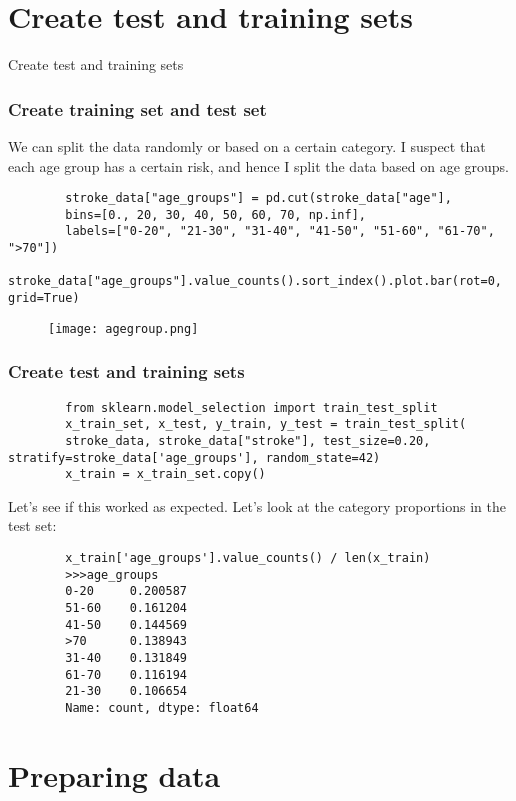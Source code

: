 \documentclass[10pt]{beamer}
\theoremstyle{definition}
\theoremstyle{remark}
\numberwithin{equation}{section}
\begin{document}
\section{Create test and training sets}

\begin{frame}
	\centering\large Create test and training sets
\end{frame}
\begingroup
\footnotesize
\begin{frame}[fragile]
	\frametitle{Create training set and test set}
	We can split the data randomly or based on a certain category. I suspect that each age group has a certain risk, and hence I split the data based on age groups.
	\begin{lstlisting}
		stroke_data["age_groups"] = pd.cut(stroke_data["age"],
		bins=[0., 20, 30, 40, 50, 60, 70, np.inf],
		labels=["0-20", "21-30", "31-40", "41-50", "51-60", "61-70", ">70"])
		stroke_data["age_groups"].value_counts().sort_index().plot.bar(rot=0, grid=True)
	\end{lstlisting}
	
	\begin{figure}[h]
		\texttt{[image: agegroup.png]}
	\end{figure}
\end{frame}
\endgroup 


\begin{frame}[fragile]
	\frametitle{Create test and training sets}
	
	\begin{lstlisting}
		from sklearn.model_selection import train_test_split
		x_train_set, x_test, y_train, y_test = train_test_split(
		stroke_data, stroke_data["stroke"], test_size=0.20, stratify=stroke_data['age_groups'], random_state=42)
		x_train = x_train_set.copy()
	\end{lstlisting}
	
	Let’s see if this worked as expected. Let's look at the
	category proportions in the test set:
	
	\begin{lstlisting}
		x_train['age_groups'].value_counts() / len(x_train)
		>>>age_groups
		0-20     0.200587
		51-60    0.161204
		41-50    0.144569
		>70      0.138943
		31-40    0.131849
		61-70    0.116194
		21-30    0.106654
		Name: count, dtype: float64
	\end{lstlisting}
\end{frame}

\section{Preparing data}
\end{document}
